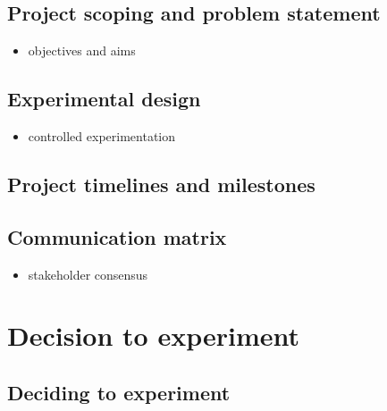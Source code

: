 \documentclass[]{book}
\providecommand{\tightlist}{%
  \setlength{\itemsep}{0pt}\setlength{\parskip}{0pt}}
\begin{document}
\hypertarget{project-scoping-and-problem-statement}{%
\section{Project scoping and problem statement}\label{project-scoping-and-problem-statement}}

\begin{itemize}
\tightlist
\item
  objectives and aims
\end{itemize}

\hypertarget{experimental-design}{%
\section{Experimental design}\label{experimental-design}}

\begin{itemize}
\tightlist
\item
  controlled experimentation
\end{itemize}

\hypertarget{project-timelines-and-milestones}{%
\section{Project timelines and milestones}\label{project-timelines-and-milestones}}

\hypertarget{communication-matrix}{%
\section{Communication matrix}\label{communication-matrix}}

\begin{itemize}
\tightlist
\item
  stakeholder consensus
\end{itemize}

\hypertarget{decision-to-experiment}{%
\chapter{Decision to experiment}\label{decision-to-experiment}}

\hypertarget{deciding-to-experiment}{%
\section{Deciding to experiment}\label{deciding-to-experiment}}
\end{document}
